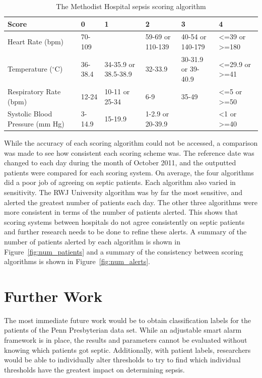 \documentclass{sig-alternate}
\begin{document}
\begin{table}
\renewcommand{\arraystretch}{1.5}
  \begin{tabular}{| l | l | l | l | l | l |}
\hline

{\bf Score} & {\bf 0} & {\bf 1} & {\bf 2} & {\bf 3} & {\bf 4}\\ \hline
Heart Rate (bpm) & 70-109 & & 59-69 or 110-139 & 40-54 or 140-179 & <=39 or >=180\\ \hline
Temperature ($^\circ$C) & 36-38.4 & 34-35.9 or 38.5-38.9 & 32-33.9 & 30-31.9 or 39-40.9 & <=29.9 or >=41\\ \hline
Respiratory Rate (bpm) & 12-24 & 10-11 or 25-34 & 6-9 & 35-49 & <=5 or >=50\\ \hline
Systolic Blood Pressure (mm Hg) & 3-14.9 & 15-19.9 & 1-2.9 or 20-39.9 & & <1 or >=40\\ \hline

 \end{tabular}
	\caption{The Methodist Hospital sepsis scoring algorithm}
  \label{tab:mh_table}
\end{table}

While the accuracy of each scoring algorithm could not be accessed, a comparison was made to see how consistent each scoring scheme was.  The reference date was changed to each day during the month of October 2011, and the outputted patients were compared for each scoring system.  On average, the four algorithms did a poor job of agreeing on septic patients.  Each algorithm also varied in sensitivity.  The RWJ University algorithm was by far the most sensitive, and alerted the greatest number of patients each day.  The other three algorithms were more consistent in terms of the number of patients alerted.  This shows that scoring systems between hospitals do not agree consistently on septic patients and further research needs to be done to refine these alerts.  A summary of the number of patients alerted by each algorithm is shown in Figure~\ref{fig:num_patients} and a summary of the consistency between scoring algorithms is shown in Figure~\ref{fig:num_alerts}.

\vspace{10pt}
\section{Further Work}
\vspace{10pt}
\label{sec:furtherwork}

The most immediate future work would be to obtain classification labels for the patients of the Penn Presbyterian data set.  While an adjustable smart alarm framework is in place, the results and parameters cannot be evaluated without knowing which patients got septic.  Additionally, with patient labels, researchers would be able to individually alter thresholds to try to find which individual thresholds have the greatest impact on determining sepsis.  
\end{document}
